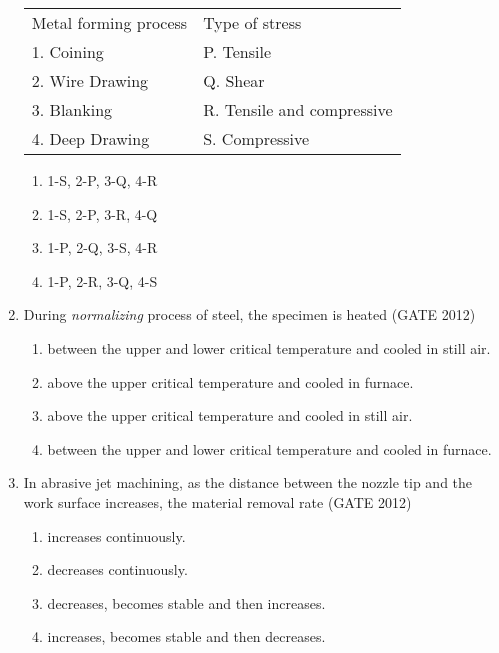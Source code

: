 \documentclass[journal,12pt,onecolumn]{IEEEtran}
\theoremstyle{remark}
\begin{document}
\begin{enumerate}
\begin{center}
\begin{tabular}{ll}
Metal forming process & Type of stress \\
1. Coining       & P. Tensile \\
2. Wire Drawing  & Q. Shear \\
3. Blanking      & R. Tensile and compressive \\
4. Deep Drawing  & S. Compressive \\
\end{tabular}
\end{center}

\begin{enumerate}
\item 1-S, 2-P, 3-Q, 4-R
\item 1-S, 2-P, 3-R, 4-Q
\item 1-P, 2-Q, 3-S, 4-R
\item 1-P, 2-R, 3-Q, 4-S
\end{enumerate}

\vspace{1cm}
\item During \textit{normalizing} process of steel, the specimen is heated
\hfill{(GATE 2012)}

\begin{enumerate}
\item between the upper and lower critical temperature and cooled in still air.
\item above the upper critical temperature and cooled in furnace.
\item above the upper critical temperature and cooled in still air.
\item between the upper and lower critical temperature and cooled in furnace.
\end{enumerate}

\vspace{1cm}
\item  In abrasive jet machining, as the distance between the nozzle tip and the work surface increases, the material removal rate
\hfill{(GATE 2012)}

\begin{enumerate}
\item increases continuously.
\item decreases continuously.
\item decreases, becomes stable and then increases.
\item increases, becomes stable and then decreases.
\end{enumerate}


\end{enumerate}
\end{document}
